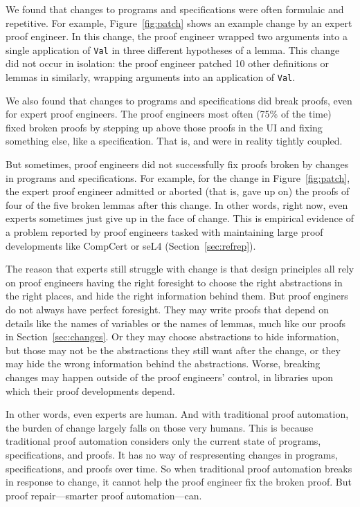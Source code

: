 We found that changes to programs and specifications were often formulaic and repetitive.
For example, Figure~\ref{fig:patch} shows an example change by an expert proof engineer.
In this change, the proof engineer wrapped two arguments into a single application of \lstinline{Val}
in three different hypotheses of a lemma.
This change did not occur in isolation: the proof engineer patched 10 other definitions or lemmas
in similarly, wrapping arguments into an application of
\lstinline{Val}.

We also found that changes to programs and specifications did break proofs, even for expert proof engineers.
The proof engineers most often (75\% of the time) fixed broken proofs by stepping 
up above those proofs in the UI and fixing something else, like a specification.
That is,  and  were in reality tightly coupled.

But sometimes, proof engineers did not successfully fix proofs broken by changes in programs and specifications.
For example, for the change in Figure~\ref{fig:patch},
the expert proof engineer admitted or aborted (that is, gave up on) the proofs of four of the five
broken lemmas after this change.
In other words, right now, even experts sometimes just give up in the face of change.
This is empirical evidence of a problem reported by proof engineers
tasked with maintaining large proof developments
like CompCert or seL4 (Section~\ref{sec:refrep}).

The reason that experts still struggle with change is that
design principles all rely on proof engineers having the right foresight to choose the 
right abstractions in the right places, and hide the right information behind them.
But proof enginers do not always have perfect foresight.
They may write proofs that depend on details like the names of variables or the names of lemmas,
much like our proofs in Section~\ref{sec:changes}.
Or they may choose abstractions to hide information, but those may not be the abstractions they still want after the change,
or they may hide the wrong information behind the abstractions.
Worse, breaking changes may happen outside of the proof engineers' control,
in libraries upon which their proof developments depend.

In other words, even experts are human.
And with traditional proof automation, the burden of change largely falls on those very humans.
This is because traditional proof automation considers only the current state of programs, specifications, and proofs.
It has no way of respresenting changes in programs, specifications, and proofs over time.
So when traditional proof automation breaks in response to change, it cannot help the proof engineer fix the broken proof.
But proof repair---smarter proof automation---can.

